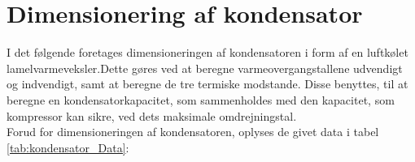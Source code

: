 \documentclass[../Hovedrapport.tex]{subfiles}
\begin{document}
\section{Dimensionering af kondensator}
    \label{sec:dim_kondensator}
I det følgende foretages dimensioneringen af kondensatoren i form af en luftkølet lamelvarmeveksler.Dette gøres ved at beregne varmeovergangstallene udvendigt og indvendigt, samt at beregne de tre termiske modstande. Disse benyttes, til at beregne en kondensatorkapacitet, som sammenholdes med den kapacitet, som kompressor kan sikre, ved dets maksimale omdrejningstal. \\
Forud for dimensioneringen af kondensatoren, oplyses de givet data i tabel \ref{tab:kondensator_Data}:
\end{document}

